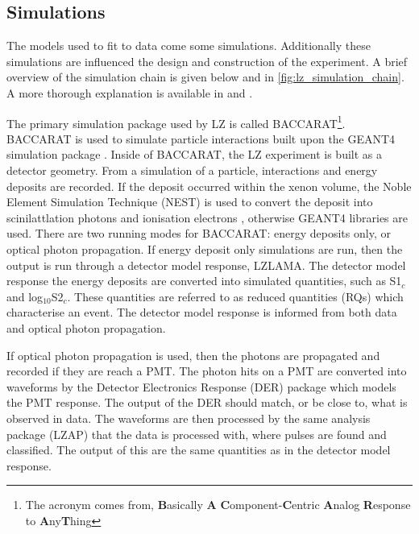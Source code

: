 \subsection{Simulations}
\label{sec:lz_simluations_chain}
\par
The models used to fit to data come some simulations.
Additionally these simulations are influenced the design and construction of the experiment.
A brief overview of the simulation chain is given below and in \autoref{fig:lz_simulation_chain}.
A more thorough explanation is available in \cite{lz_simulations_ref} and \cite{theresafruth_thesis_ref}.
\par
The primary simulation package used by LZ is called BACCARAT\footnote{The acronym comes from, \textbf{B}asically \textbf{A} \textbf{C}omponent-\textbf{C}entric \textbf{A}nalog \textbf{R}esponse to \textbf{A}ny\textbf{T}hing}.
BACCARAT is used to simulate particle interactions built upon the GEANT4 simulation package \cite{geant4_geometry_ref}.
Inside of BACCARAT, the LZ experiment is built as a detector geometry.
From a simulation of a particle, interactions and energy deposits are recorded.
If the deposit occurred within the xenon volume, the Noble Element Simulation Technique (NEST) is used to convert the deposit into scinilattlation photons and ionisation electrons \cite{nest_1_ref}, otherwise GEANT4 libraries are used.
There are two running modes for BACCARAT: energy deposits only, or optical photon propagation.
If energy deposit only simulations are run, then the output is run through a detector model response, LZLAMA.
The detector model response the energy deposits are converted into simulated quantities, such as S1$_c$ and log$_{10}$S2$_c$.
These quantities are referred to as reduced quantities (RQs) which characterise an event.
The detector model response is informed from both data and optical photon propagation.
\par
If optical photon propagation is used, then the photons are propagated and recorded if they are reach a PMT.
The photon hits on a PMT are converted into waveforms by the Detector Electronics Response (DER) package which models the PMT response.
The output of the DER should match, or be close to, what is observed in data.
The waveforms are then processed by the same analysis package (LZAP) that the data is processed with, where pulses are found and classified.
The output of this are the same quantities as in the detector model response.


